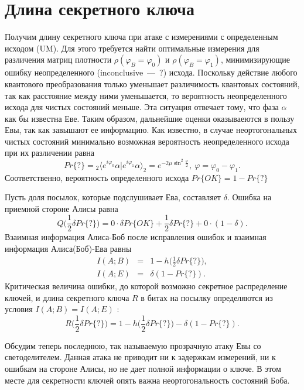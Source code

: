 \section{Длина секретного ключа}
Получим длину секретного ключа при атаке с измерениями с определенным исходом (UM). Для этого требуется найти оптимальные измерения для различения матриц плотности $\rho(\varphi_B = \varphi_0)$ и $\rho(\varphi_B = \varphi_1)$, минимизирующие ошибку неопределенного (inconclusive~---~?) исхода. 
Поскольку действие любого квантового преобразования только уменьшает различимость квантовых состояний, так как расстояние между ними уменьшается, то вероятность неопределенного исхода для чистых состояний меньше. Эта ситуация отвечает тому, что фаза $\alpha$ как бы известна Еве. Таким образом, дальнейшие оценки оказываеются в пользу Евы, так как завышают ее информацию. 
Как известно, в случае неортогональных чистых состояний минимально возможная вероятность неопределенного исхода при их различении равна
\begin{equation*}
  Pr\{?\} = {}_2 \langle e^{i \varphi_0} \alpha | e^{i \varphi_1} \alpha \rangle_2 = e^{-2\mu\sin^2{\frac{\varphi}{2}}},~\varphi = \varphi_0 - \varphi_1.
\end{equation*}
Соответственно, вероятность определенного исхода $ Pr\{OK\} = 1 - Pr\{?\} $

Пусть доля посылок, которые подслушивает Ева, составляет $\delta$. Ошибка на приемной стороне Алисы равна
\begin{equation*}
  Q\bigg(\frac{1}{2}\delta Pr\{?\}\bigg) = 0 \cdot \delta Pr\{OK\} + \frac{1}{2}\delta Pr\{?\} + 0 \cdot (1 - \delta).
\end{equation*}
Взаимная информация Алиса-Боб после исправления ошибок и взаимная информация Алиса(Боб)-Ева равны
\begin{eqnarray*}
  I(A;B) &=& 1 - h\bigg(\frac{1}{2}\delta Pr\{?\}\bigg), \\
  I(A;E) &=& \delta(1 - Pr\{?\}).
\end{eqnarray*}
Критическая величина ошибки, до которой возможно секретное распределение ключей, и длина секретного ключа $R$ в битах на посылку определяются из условия $I(A;B) = I(A;E)$ \cite{renner2006SecQuaKeyDis}:
\begin{equation*}
  R\bigg(\frac{1}{2}\delta Pr\{?\}\bigg) = 1 - h\bigg(\frac{1}{2}\delta Pr\{?\}\bigg) - \delta(1 - Pr\{?\}).
\end{equation*}

Обсудим теперь последнюю, так называемую прозрачную атаку Евы со светоделителем. Данная атака не приводит ни к задержкам измерений, ни к ошибкам на стороне Алисы, но не дает полной информации о ключе. 
В этом месте для секретности ключей опять важна неортогональность состояний Боба.

